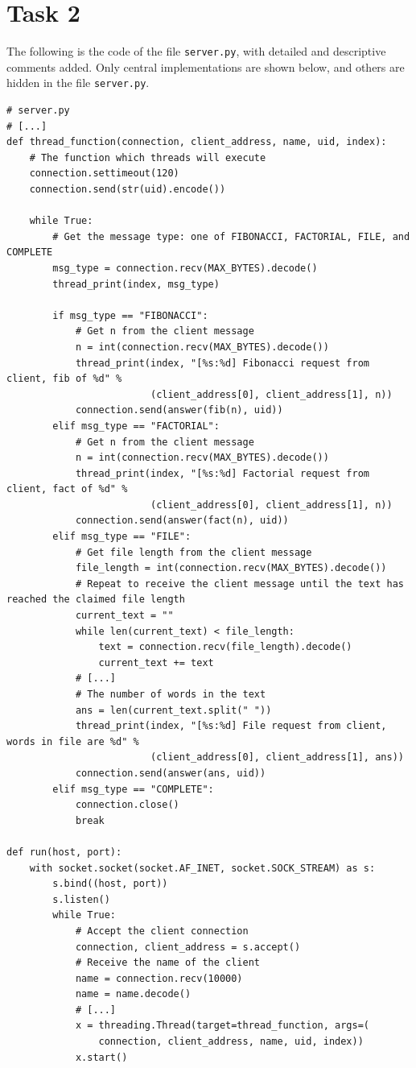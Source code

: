 \documentclass{homework}
\begin{document}
\section{Task 2}

The following is the code of the file \texttt{server.py}, with detailed and descriptive comments added. Only central implementations are shown below, and others are hidden in the file \texttt{server.py}.

\newpage

\begin{verbatim}
# server.py
# [...]
def thread_function(connection, client_address, name, uid, index):
    # The function which threads will execute
    connection.settimeout(120)
    connection.send(str(uid).encode())
    
    while True:
        # Get the message type: one of FIBONACCI, FACTORIAL, FILE, and COMPLETE
        msg_type = connection.recv(MAX_BYTES).decode()
        thread_print(index, msg_type)

        if msg_type == "FIBONACCI":
            # Get n from the client message
            n = int(connection.recv(MAX_BYTES).decode())
            thread_print(index, "[%s:%d] Fibonacci request from client, fib of %d" %
                         (client_address[0], client_address[1], n))
            connection.send(answer(fib(n), uid))
        elif msg_type == "FACTORIAL":
            # Get n from the client message
            n = int(connection.recv(MAX_BYTES).decode())
            thread_print(index, "[%s:%d] Factorial request from client, fact of %d" %
                         (client_address[0], client_address[1], n))
            connection.send(answer(fact(n), uid))
        elif msg_type == "FILE":
            # Get file length from the client message
            file_length = int(connection.recv(MAX_BYTES).decode())
            # Repeat to receive the client message until the text has reached the claimed file length
            current_text = ""
            while len(current_text) < file_length:
                text = connection.recv(file_length).decode()
                current_text += text
            # [...]
            # The number of words in the text
            ans = len(current_text.split(" "))
            thread_print(index, "[%s:%d] File request from client, words in file are %d" %
                         (client_address[0], client_address[1], ans))
            connection.send(answer(ans, uid))
        elif msg_type == "COMPLETE":
            connection.close()
            break

def run(host, port):
    with socket.socket(socket.AF_INET, socket.SOCK_STREAM) as s:
        s.bind((host, port))
        s.listen()
        while True:
            # Accept the client connection
            connection, client_address = s.accept()
            # Receive the name of the client
            name = connection.recv(10000)
            name = name.decode()
            # [...]
            x = threading.Thread(target=thread_function, args=(
                connection, client_address, name, uid, index))
            x.start()
\end{verbatim}
\end{document}
